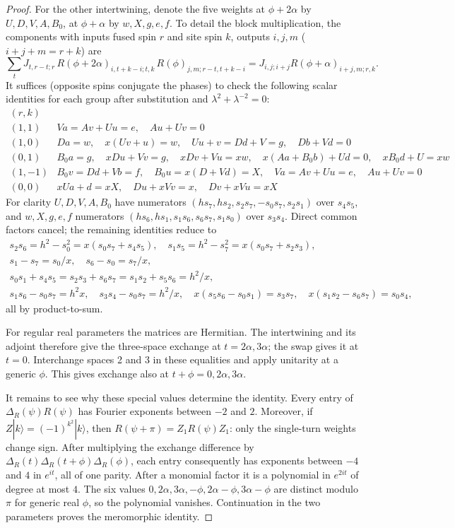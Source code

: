 \begin{proof}
For the other intertwining, denote the five weights at $\phi+2\alpha$ by $U,D,V,A,B_0$, at $\phi+\alpha$ by $w,X,g,e,f$. To detail the block multiplication, the components with inputs fused spin $r$ and site spin $k$, outputs $i,j,m$ ($i+j+m=r+k$) are
\[
\sum_t J_{t,r-t;r}\, R(\phi+2\alpha)_{i,t+k-i;t,k}\,R(\phi)_{j,m;r-t,t+k-i}
 = J_{i,j;i+j} R(\phi+\alpha)_{i+j,m;r,k}.
\]
It suffices (opposite spins conjugate the phases) to check the following scalar identities for each group after substitution and $\lambda^2+\lambda^{-2}=0$:
{\small
\[
\begin{array}{c|l}
(r,k) &\\ \hline
(1,1) & Va=Av+Uu=e,\quad Au+Uv=0\\
(1,0)& Da=w,\quad x(Uv+u)=w,\quad Uu+v=Dd+V=g,\quad Db+Vd=0\\
(0,1)& B_0 a=g,\quad x D u+Vv=g,\quad x Dv+Vu=xw,\quad x(Aa+B_0 b)+Ud=0,\quad xB_0 d+U=xw\\
(1,-1)& B_0 v=Dd+V b=f,\quad B_0 u=x(D+Vd)=X,\quad Va=Av+Uu=e,\quad Au+Uv=0\\
(0,0)& x Ua+d=x X,\quad D u+x Vv=x,\quad Dv+x Vu=x X
\end{array}
\]
}
For clarity $U,D,V,A,B_0$ have numerators $(h s_7,h s_2,s_2 s_7,-s_0s_7,s_2s_1)$ over $s_4s_5$, and $w,X,g,e,f$ numerators $(h s_6,h s_1,s_1s_6,s_6s_7,s_1s_0)$ over $s_3s_4$. Direct common factors cancel; the remaining identities reduce to
\[
\begin{gathered}
 s_2s_6=h^2-s_0^2=x(s_0s_7+s_4s_5),
 \quad s_1s_5=h^2-s_7^2=x(s_0s_7+s_2s_3),\\
 s_1-s_7=s_0/x,\quad s_6-s_0=s_7/x,\\
 s_0s_1+s_4s_5=s_2s_3+s_6s_7=s_1s_2+s_5s_6=h^2/x,\\
 s_1s_6-s_0s_7=h^2 x,\quad s_3s_4-s_0s_7=h^2/x,\quad
 x(s_5s_6-s_0s_1)=s_3s_7,\quad x(s_1s_2-s_6s_7)=s_0s_4,
\end{gathered}
\]
all by product-to-sum.

For regular real parameters the matrices are Hermitian. The intertwining
and its adjoint therefore give the three-space exchange at
$t=2\alpha,3\alpha$; the swap gives it at $t=0$. Interchange spaces
2 and 3 in these equalities and apply unitarity at a generic $\phi$.
This gives exchange also at $t+\phi=0,2\alpha,3\alpha$.

It remains to see why these special values determine the identity.
Every entry of $\Delta_R(\psi)R(\psi)$ has Fourier exponents between
$-2$ and $2$. Moreover, if $Z|k\rangle=(-1)^{k^2}|k\rangle$, then
$R(\psi+\pi)=Z_1R(\psi)Z_1$: only the single-turn weights change
sign. After multiplying the exchange difference by
$\Delta_R(t)\Delta_R(t+\phi)\Delta_R(\phi)$, each entry consequently
has exponents between $-4$ and $4$ in $e^{it}$, all of one parity.
After a monomial factor it is a polynomial in $e^{2it}$ of degree at
most $4$. The six values
$0,2\alpha,3\alpha,-\phi,2\alpha-\phi,3\alpha-\phi$ are distinct
modulo $\pi$ for generic real $\phi$, so the polynomial vanishes.
Continuation in the two parameters proves the meromorphic identity.
\end{proof}

